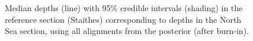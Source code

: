 \documentclass[
  letterpaper,
  DIV=11,
  numbers=noendperiod]{scrartcl}
\begin{document}
\begin{figure}[H]


\caption{\label{fig-12}Median depths (line) with 95\% credible intervals
(shading) in the reference section (Staithes) corresponding to depths in
the North Sea section, using all alignments from the posterior (after
burn-in).}

\end{figure}%
\end{document}
